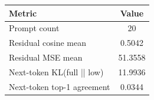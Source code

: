 \begin{tabular}{lc}
\toprule
Metric & Value \\
\midrule
Prompt count & 20 \\
Residual cosine mean & 0.5042 \\
Residual MSE mean & 51.3558 \\
Next-token KL(full || low) & 11.9936 \\
Next-token top-1 agreement & 0.0344 \\
\bottomrule
\end{tabular}
